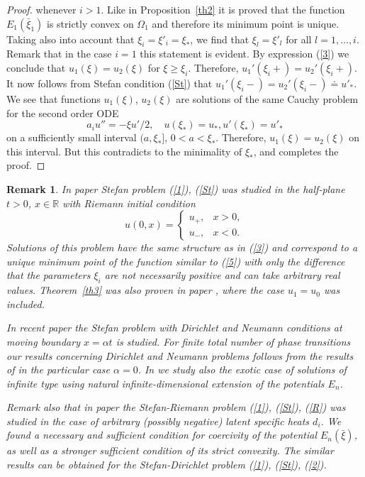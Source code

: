 \documentclass[10pt,a4paper]{amsart}
\newtheorem{remark}{Remark}[section]
\numberwithin{equation}{section}
\newcommand{\R}{{\mathbb R}}
\begin{document}
\begin{proof}
whenever $i>1$. Like in Proposition~\ref{th2} it is proved that the function $E_1(\bar\xi_1)$ is strictly convex on $\Omega_1$ and therefore its minimum point is unique. Taking also into account that $\xi_i=\xi'_i=\xi_*$, we find that $\xi_l=\xi'_l$ for all $l=1,\ldots,i$. Remark that in the case $i=1$ this statement is evident. By expression (\ref{3}) we conclude that $u_1(\xi)=u_2(\xi)$ for
$\xi\ge\xi_i$. Therefore, $u_1'(\xi_i+)=u_2'(\xi_i+)$. It now follows from Stefan condition (\ref{St}) that $u_1'(\xi_i-)=u_2'(\xi_i-)\doteq u'_*$. We see that functions $u_1(\xi)$, $u_2(\xi)$ are solutions of the same Cauchy problem for the second order ODE
\[a_iu''=-\xi u'/2, \quad u(\xi_*)=u_*, u'(\xi_*)=u'_*
\]
on a sufficiently small interval $(a,\xi_*]$, $0<a<\xi_*$. Therefore, $u_1(\xi)=u_2(\xi)$ on this interval. But this contradicts to the minimality of $\xi_*$, and completes the proof.
\end{proof}


\begin{remark}\label{rem2} In paper \cite{Pan2} Stefan problem (\ref{1}), (\ref{St}) was studied in the half-plane $t>0$, $x\in\R$ with Riemann initial condition
\begin{equation}
\label{R}
u(0,x)=\left\{\begin{array}{lr} u_+, & x>0, \\ u_-, & x<0. \end{array}\right.
\end{equation}
Solutions of this problem have the same structure as in (\ref{3}) and correspond to a unique minimum point of the function similar to (\ref{5}) with only the difference that the parameters $\xi_i$ are not necessarily positive and can take arbitrary real values. Theorem~\ref{th3} was also proven in paper \cite{Pan3}, where the case $u_1=u_0$ was included.

 In recent paper \cite{Pan4} the Stefan problem with Dirichlet and Neumann conditions at moving boundary $x=\alpha t$ is studied. For finite total number of phase transitions
our results concerning Dirichlet and Neumann problems follows from the results of \cite{Pan4} in the particular case $\alpha=0$. In \cite{Pan4} we study also the exotic case of solutions of infinite type using natural infinite-dimensional extension of the potentials $E_n$.

Remark also that in paper \cite{Pan1} the Stefan-Riemann problem (\ref{1}), (\ref{St}), (\ref{R}) was studied in the case of arbitrary (possibly negative) latent specific heats $d_i$. We found a necessary and sufficient condition for coercivity of the potential $E_n(\bar\xi)$, as well as a stronger sufficient condition of its strict convexity. The similar results can be obtained for the Stefan-Dirichlet problem (\ref{1}), (\ref{St}), (\ref{2}).
\end{remark}
\end{document}
